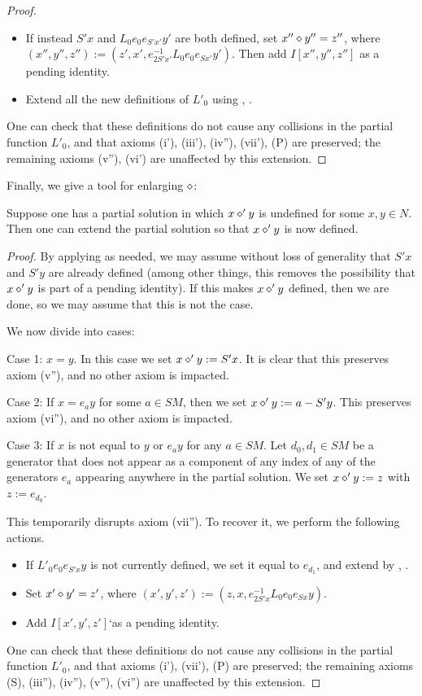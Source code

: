 \begin{proof}
\begin{itemize}
\item If instead $S' x$ and $L_0 e_0 e_{S'x'} y'$ are both defined, set $x'' \diamond y'' = z''$, where $(x'',y'',z'') := (z', x', e_{2S'x'}^{-1} L_0 e_0 e_{Sx'} y')$.  Then add $I[x'',y'',z'']$ as a pending identity.
\item Extend all the new definitions of $L'_0$ using , .
\end{itemize}
One can check that these definitions do not cause any collisions in the partial function $L'_0$, and that axioms (i'), (iii'), (iv''), (vii'), (P) are preserved; the remaining axioms (v''), (vi') are unaffected by this extension.
\end{proof}

Finally, we give a tool for enlarging $\op$:

\begin{proposition}[Enlarging $\op$]\label{enlarge-op}  Suppose one has a partial solution in which $x \diamond' y$ is undefined for some $x,y \in N$.  Then one can extend the partial solution so that $x \diamond' y$ is now defined.
\end{proposition}

\begin{proof}  By applying  as needed, we may assume without loss of generality that $S'x$ and $S'y$ are already defined (among other things, this removes the possibility that $x \diamond' y$ is part of a pending identity).  If this makes $x \diamond' y$ defined, then we are done, so we may assume that this is not the case.

We now divide into cases:

Case 1: $x=y$.  In this case we set $x \diamond' y := S'x$.  It is clear that this preserves axiom (v''), and no other axiom is impacted.

Case 2: If $x = e_a y$ for some $a \in SM$, then we set $x \diamond' y := a - S'y$.  This preserves axiom (vi''), and no other axiom is impacted.

Case 3: If $x$ is not equal to $y$ or $e_a y$ for any $a \in SM$.  Let $d_0, d_1 \in SM$ be a generator that does not appear as a component of any index of any of the generators $e_a$ appearing anywhere in the partial solution.  We set $x \diamond' y := z$ with $z := e_{d_0}$.

This temporarily disrupts axiom (vii'').  To recover it, we perform the following actions.
\begin{itemize}
  \item If $L'_0 e_0 e_{S'x} y$ is not currently defined, we set it equal to $e_{d_1}$, and extend by , .
  \item Set $x' \diamond y' = z'$, where $(x',y',z') := (z, x, e_{2S'x}^{-1} L_0 e_0 e_{Sx} y)$.
  \item Add $I[x',y',z']$`as a pending identity.
\end{itemize}

One can check that these definitions do not cause any collisions in the partial function $L'_0$, and that axioms (i'), (vii'), (P) are preserved; the remaining axioms (S), (iii''), (iv''), (v''), (vi'') are unaffected by this extension.
\end{proof}


